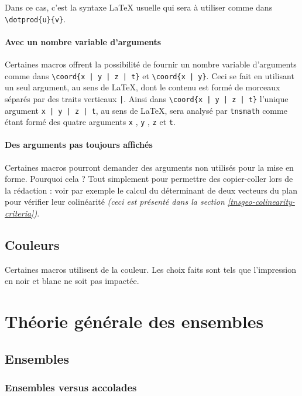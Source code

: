 \documentclass[12pt,a4paper]{book}
\newcommand\env[1]{\texttt{#1}}
\newcommand\macro[1]{\env{\textbackslash{}#1}}
\theoremstyle{definition}
\begin{document}
{{Dans ce cas, c'est la syntaxe \LaTeX{} usuelle qui sera à utiliser comme dans \macro{dotprod\{u\}\{v\}}.




\subsubsection{Avec un nombre variable d'arguments}

Certaines macros offrent la possibilité de fournir un nombre variable d'arguments comme dans \macro{coord\{x | y | z | t\}} et \macro{coord\{x | y\}}.
Ceci se fait en utilisant un seul argument, au sens de \LaTeX{}, dont le contenu est formé de morceaux séparés par des traits verticaux \verb+|+.
Ainsi dans \macro{coord\{x | y | z | t\}} l'unique argument \verb+x | y | z | t+, au sens de \LaTeX{}, sera analysé par \verb+tnsmath+ comme étant formé des quatre arguments \verb+x+ , \verb+y+ , \verb+z+ et \verb+t+.




\subsubsection{Des arguments pas toujours affichés}

Certaines macros pourront demander des arguments non utilisés pour la mise en forme. Pourquoi cela ? Tout simplement pour permettre des copier-coller lors de la rédaction : voir par exemple le calcul du déterminant de deux vecteurs du plan pour vérifier leur colinéarité \emph{(ceci est présenté dans la section \ref{tnsgeo-colinearity-criteria})}.
\section{Couleurs}

Certaines macros utilisent de la couleur. Les choix faits sont tels que l'impression en noir et blanc ne soit pas impactée.
\chapter{Théorie générale des ensembles}

\section{Ensembles}

\subsection{Ensembles versus accolades}

}}
\end{document}
